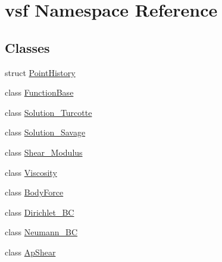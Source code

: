 \hypertarget{namespacevsf}{\section{vsf Namespace Reference}
\label{namespacevsf}
}
\subsection*{Classes}
\begin{DoxyCompactItemize}
\item 
struct \hyperlink{structvsf_1_1PointHistory}{Point\-History}
\item 
class \hyperlink{classvsf_1_1FunctionBase}{Function\-Base}
\item 
class \hyperlink{classvsf_1_1Solution__Turcotte}{Solution\-\_\-\-Turcotte}
\item 
class \hyperlink{classvsf_1_1Solution__Savage}{Solution\-\_\-\-Savage}
\item 
class \hyperlink{classvsf_1_1Shear__Modulus}{Shear\-\_\-\-Modulus}
\item 
class \hyperlink{classvsf_1_1Viscosity}{Viscosity}
\item 
class \hyperlink{classvsf_1_1BodyForce}{Body\-Force}
\item 
class \hyperlink{classvsf_1_1Dirichlet__BC}{Dirichlet\-\_\-\-B\-C}
\item 
class \hyperlink{classvsf_1_1Neumann__BC}{Neumann\-\_\-\-B\-C}
\item 
class \hyperlink{classvsf_1_1ApShear}{Ap\-Shear}
\end{DoxyCompactItemize}
